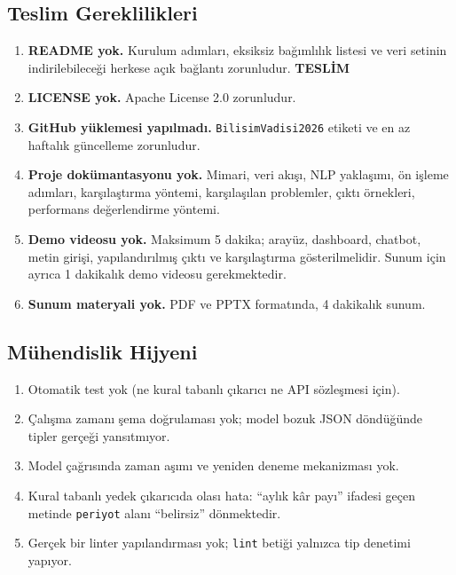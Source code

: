 \documentclass[11pt,a4paper]{article}
\newcommand{\teslimrozet}{\textcolor{teslim}{\textbf{TESLİM}}}
\begin{document}
\subsection{Teslim Gereklilikleri}

\begin{enumerate}[label=\textbf{T\arabic*.},leftmargin=1.4cm,itemsep=4pt]
  \item \textbf{README yok.} Kurulum adımları, eksiksiz bağımlılık listesi ve veri
        setinin indirilebileceği herkese açık bağlantı zorunludur. \hfill \teslimrozet
  \item \textbf{LICENSE yok.} Apache License 2.0 zorunludur.
  \item \textbf{GitHub yüklemesi yapılmadı.} \texttt{BilisimVadisi2026} etiketi ve
        en az haftalık güncelleme zorunludur.
  \item \textbf{Proje dokümantasyonu yok.} Mimari, veri akışı, NLP yaklaşımı,
        ön işleme adımları, karşılaştırma yöntemi, karşılaşılan problemler,
        çıktı örnekleri, performans değerlendirme yöntemi.
  \item \textbf{Demo videosu yok.} Maksimum 5 dakika; arayüz, dashboard, chatbot,
        metin girişi, yapılandırılmış çıktı ve karşılaştırma gösterilmelidir.
        Sunum için ayrıca 1 dakikalık demo videosu gerekmektedir.
  \item \textbf{Sunum materyali yok.} PDF ve PPTX formatında, 4 dakikalık sunum.
\end{enumerate}

\subsection{Mühendislik Hijyeni}

\begin{enumerate}[label=\textbf{M\arabic*.},leftmargin=1.4cm,itemsep=4pt]
  \item Otomatik test yok (ne kural tabanlı çıkarıcı ne API sözleşmesi için).
  \item Çalışma zamanı şema doğrulaması yok; model bozuk JSON döndüğünde tipler
        gerçeği yansıtmıyor.
  \item Model çağrısında zaman aşımı ve yeniden deneme mekanizması yok.
  \item Kural tabanlı yedek çıkarıcıda olası hata: ``aylık kâr payı'' ifadesi geçen
        metinde \texttt{periyot} alanı ``belirsiz'' dönmektedir.
  \item Gerçek bir linter yapılandırması yok; \texttt{lint} betiği yalnızca tip
        denetimi yapıyor.
\end{enumerate}
\end{document}
